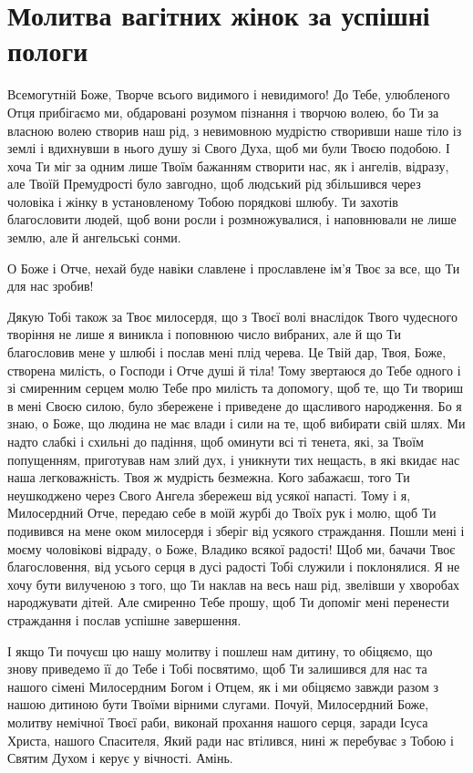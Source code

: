 \documentclass[chapters.tex]{subfiles}
\begin{document}
\section{Молитва вагітних жінок за успішні пологи}
Всемогутній Боже, Творче всього видимого і невидимого! До Тебе, улюбленого Отця прибігаємо ми, обдаровані розумом пізнання і творчою волею, бо Ти за власною волею створив наш рід, з невимовною мудрістю створивши наше тіло із землі і вдихнувши в нього душу зі Свого Духа, щоб ми були Твоєю подобою. І хоча Ти міг за одним лише Твоїм бажанням створити нас, як і ангелів, відразу, але Твоїй Премудрості було завгодно, щоб людський рід збільшився через чоловіка і жінку в установленому Тобою порядкові шлюбу. Ти захотів благословити людей, щоб вони росли і розмножувалися, і наповнювали не лише землю, але й ангельські сонми.

О Боже і Отче, нехай буде навіки славлене і прославлене ім’я Твоє за все, що Ти для нас зробив!

Дякую Тобі також за Твоє милосердя, що з Твоєї волі внаслідок Твого чудесного творіння не лише я виникла і поповнюю число вибраних, але й що Ти благословив мене у шлюбі і послав мені плід черева. Це Твій дар, Твоя, Боже, створена милість, о Господи і Отче душі й тіла! Тому звертаюся до Тебе одного і зі смиренним серцем молю Тебе про милість та допомогу, щоб те, що Ти твориш в мені Своєю силою, було збережене і приведене до щасливого народження. Бо я знаю, о Боже, що людина не має влади і сили на те, щоб вибирати свій шлях. Ми надто слабкі і схильні до падіння, щоб оминути всі ті тенета, які, за Твоїм попущенням, приготував нам злий дух, і уникнути тих нещасть, в які вкидає нас наша легковажність. Твоя ж мудрість безмежна. Кого забажаєш, того Ти неушкоджено через Свого Ангела збережеш від усякої напасті. Тому і я, Милосердний Отче, передаю себе в моїй журбі до Твоїх рук і молю, щоб Ти подивився на мене оком милосердя і зберіг від усякого страждання. Пошли мені і моєму чоловікові відраду, о Боже, Владико всякої радості! Щоб ми, бачачи Твоє благословення, від усього серця в дусі радості Тобі служили і поклонялися. Я не хочу бути вилученою з того, що Ти наклав на весь наш рід, звелівши у хворобах народжувати дітей. Але смиренно Тебе прошу, щоб Ти допоміг мені перенести страждання і послав успішне завершення.

І якщо Ти почуєш цю нашу молитву і пошлеш нам дитину, то обіцяємо, що знову приведемо її до Тебе і Тобі посвятимо, щоб Ти залишився для нас та нашого сімені Милосердним Богом і Отцем, як і ми обіцяємо завжди разом з нашою дитиною бути Твоїми вірними слугами. Почуй, Милосердний Боже, молитву немічної Твоєї раби, виконай прохання нашого серця, заради Ісуса Христа, нашого Спасителя, Який ради нас втілився, нині ж перебуває з Тобою і Святим Духом і керує у вічності. Амінь.
\end{document}
